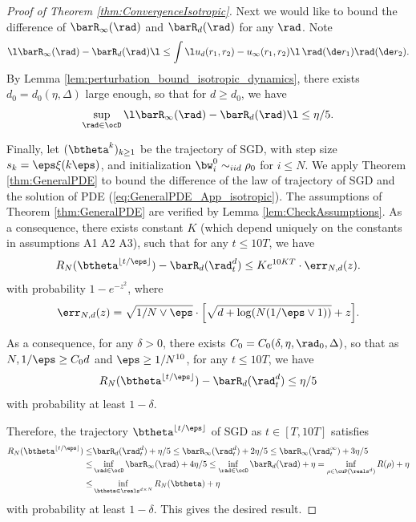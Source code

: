 \documentclass[11pt]{article}
\begin{document}
\begin{proof}[Proof of Theorem \ref{thm:ConvergenceIsotropic}]
Next we would like to bound the difference of $\barR_\infty(\rad)$ and $\barR_d(\rad)$ for any $\rad$. Note 
\begin{align}
\l \barR_\infty(\rad) - \barR_d(\rad) \l \le \int \l u_d(r_1, r_2) - u_\infty(r_1, r_2)\l\, \rad(\de r_1) \rad(\de r_2).
\end{align}
By Lemma \ref{lem:perturbation_bound_isotropic_dynamics}, there exists $d_0 = d_0(\eta, \Delta)$ large enough, so that for $d \ge d_0$, we have
\begin{align}
\sup_{\rad \in \ocD} \l \barR_\infty(\rad) - \barR_d(\rad) \l \le \eta / 5.
\end{align}

Finally, let $(\btheta^{k})_{k \ge 1}$ be the trajectory of SGD, with step size $s_k = \eps \xi(k \eps)$, and initialization $\bw_i^0 \sim_{iid} \rho_0$ for $i \le N$. We apply Theorem \ref{thm:GeneralPDE} to bound the difference of the law of trajectory of SGD and the solution of PDE (\ref{eq:GeneralPDE_App_isotropic}). The assumptions of Theorem \ref{thm:GeneralPDE} are verified by Lemma \ref{lem:CheckAssumptions}. As a consequence, there exists constant $K$ (which depend uniquely on the constants in assumptions {\sf A1} {\sf A2} {\sf A3}), such that for any $t \le 10 T$, we have
\[
R_{N}(\btheta^{\lfloor t/\eps \rfloor}) - \barR_d(\rad_t^d) \le K e^{10 KT} \cdot \err_{N, d}(z).
\]
with probability $1 - e^{-z^2}$, where
\[
\err_{N, d}(z) = \sqrt{1/N \vee \eps } \cdot \Big[\sqrt{d + \log (N (1/ \eps \vee 1))} + z \Big]. 
\]

As a consequence, for any $\delta > 0$, there exists $C_0 = C_0(\delta, \eta, \rad_0, \Delta)$, so that as $N, 1/\eps \ge C_0 d$ and $\eps \ge 1/N^{10}$, for any $t \le 10 T$, we have
\[
R_{N}(\btheta^{\lfloor t/\eps \rfloor}) - \barR_d(\rad_t^d) \le \eta/5
\]
with probability at least $1 - \delta$. 

Therefore, the trajectory $\btheta^{\lfloor t/\eps \rfloor}$ of SGD as $t \in [T, 10 T]$ satisfies
\[
\begin{aligned}
R_{N}(\btheta^{\lfloor t / \eps\rfloor}) \le&  \barR_d(\rad_t^d) + \eta/5 \le \barR_\infty(\rad_t^d) + 2\eta/5  \le \barR_\infty(\rad_t^\infty) + 3\eta / 5 \\
\le& \inf_{\rad \in \ocD} \barR_\infty(\rad) + 4\eta/5 \le \inf_{\rad \in \ocD} \barR_d(\rad) + \eta = \inf_{\rho \in \cuP(\reals^d)} R(\rho) + \eta \\
\le&\inf_{\btheta \in \reals^{d \times N}} R_N(\btheta) + \eta
\end{aligned}
\]
with probability at least $1 - \delta$. This gives the desired result. 

\end{proof}
\end{document}
